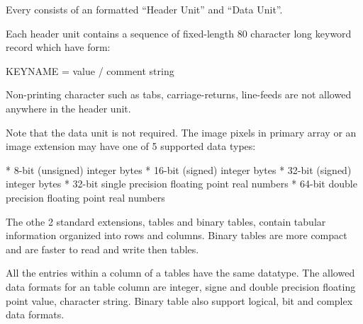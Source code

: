 Every  consists of an  formatted ``Header Unit'' and
``Data Unit''.

Each header unit contains a sequence of fixed-length 80
character long keyword record which have form:

\begtt
KEYNAME = value / comment string
\endtt

Non-printing  character such as tabs,
carriage-returns, line-feeds are not allowed anywhere in
the header unit.

Note that the data unit is not required. The image pixels
in primary array or an image extension may have one of
5 supported data types:

\begitems
* 8-bit (unsigned) integer bytes
* 16-bit (signed) integer bytes
* 32-bit (signed) integer bytes
* 32-bit single precision floating point real numbers
* 64-bit double precision floating point real numbers
\enditems

The othe 2 standard extensions,  tables and binary
tables, contain tabular information organized into rows
and columns. Binary tables are more compact and are faster
to read and write then  tables.

All the entries within a column of a tables have the same
datatype. The allowed data formats for an  table
column are integer, signe and double precision floating
point value, character string. Binary table also support
logical, bit and complex data formats.
